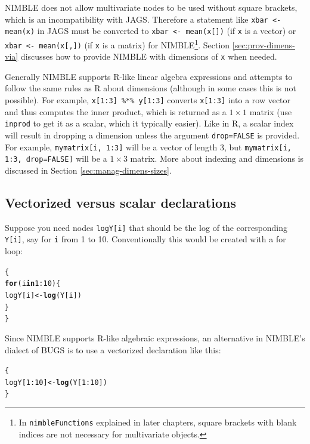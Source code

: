 \documentclass[12pt,oneside]{book}\usepackage[]{graphicx}\usepackage[]{color}
\makeatletter
\newcommand{\hlnum}[1]{\textcolor[rgb]{0.686,0.059,0.569}{#1}}%
\newcommand{\hlopt}[1]{\textcolor[rgb]{0,0,0}{#1}}%
\newcommand{\hlstd}[1]{\textcolor[rgb]{0.345,0.345,0.345}{#1}}%
\newcommand{\hlkwa}[1]{\textcolor[rgb]{0.161,0.373,0.58}{\textbf{#1}}}%
\newcommand{\hlkwb}[1]{\textcolor[rgb]{0.69,0.353,0.396}{#1}}%
\newcommand{\hlkwd}[1]{\textcolor[rgb]{0.737,0.353,0.396}{\textbf{#1}}}%
\newenvironment{kframe}{%
 \def\at@end@of@kframe{}%
 \ifinner\ifhmode%
  \def\at@end@of@kframe{\end{minipage}}%
  \begin{minipage}{\columnwidth}%
 \fi\fi%
 \def\FrameCommand##1{\hskip\@totalleftmargin \hskip-\fboxsep
 \colorbox{shadecolor}{##1}\hskip-\fboxsep
     \hskip-\linewidth \hskip-\@totalleftmargin \hskip\columnwidth}%
 \MakeFramed {\advance\hsize-\width
   \@totalleftmargin\z@ \linewidth\hsize
   \@setminipage}}%
 {\par\unskip\endMakeFramed%
 \at@end@of@kframe}
\newenvironment{knitrout}{}{} %
\def\cd#1{\texttt{#1}}
\makeatother
\begin{document}
NIMBLE does not allow multivariate nodes to be used without
square brackets, which is an incompatibility with JAGS.  Therefore a statement like \cd{xbar <- mean(x)} in JAGS must be converted to
\cd{xbar <- mean(x[])} (if \cd{x} is a vector) or \cd{xbar <-
 mean(x[,])} (if \cd{x} is a matrix) for NIMBLE\footnote{In \cd{nimbleFunctions}
  explained in later chapters, square brackets with blank indices are
  not necessary for multivariate objects.}. Section \ref{sec:prov-dimens-via} discusses how to provide NIMBLE with dimensions of \cd{x} when needed.

Generally NIMBLE supports R-like linear algebra expressions and attempts to follow the same rules as R about
dimensions (although in some cases this is not possible).  For
example, \cd{x[1:3] \%*\% y[1:3]} converts \cd{x[1:3]} into a row
vector and thus computes the inner product, which is returned as a $1
\times 1$ matrix (use \cd{inprod} to get it as a scalar, which it typically easier).  Like in R,
a scalar index will result in dropping a dimension unless the argument
\cd{drop=FALSE} is provided.  For example, \cd{mymatrix[i, 1:3]} will
be a vector of length 3, but \cd{mymatrix[i, 1:3, drop=FALSE]} will be
a $1 \times 3$ matrix.  More about indexing and dimensions is
discussed in Section \ref{sec:manag-dimens-sizes}.

\subsection{Vectorized versus scalar declarations}
\label{subsec:vectorized-versus-scalar-declarations}

Suppose you need nodes \cd{logY[i]} that should be the log of the
corresponding \cd{Y[i]}, say for \cd{i} from 1 to 10.  Conventionally
this would be created with a for loop:
\begin{knitrout}
\color{fgcolor}\begin{kframe}
\begin{alltt}
\hlstd{\{}
    \hlkwa{for}\hlstd{(i} \hlkwa{in} \hlnum{1}\hlopt{:}\hlnum{10}\hlstd{) \{}
        \hlstd{logY[i]} \hlkwb{<-} \hlkwd{log}\hlstd{(Y[i])}
    \hlstd{\}}
\hlstd{\}}
\end{alltt}
\end{kframe}
\end{knitrout}

Since NIMBLE supports R-like algebraic expressions, an alternative in
NIMBLE's dialect of BUGS is to use a vectorized declaration like this:
\begin{knitrout}
\color{fgcolor}\begin{kframe}
\begin{alltt}
\hlstd{\{}
    \hlstd{logY[}\hlnum{1}\hlopt{:}\hlnum{10}\hlstd{]} \hlkwb{<-} \hlkwd{log}\hlstd{(Y[}\hlnum{1}\hlopt{:}\hlnum{10}\hlstd{])}
\hlstd{\}}
\end{alltt}
\end{kframe}
\end{knitrout}
\end{document}
